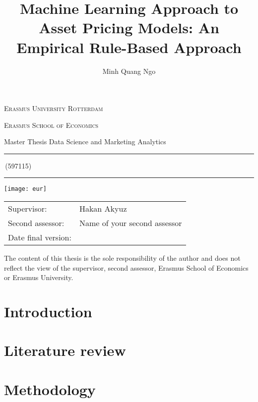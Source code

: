 \documentclass[a4paper,11pt]{article}
\author{Minh Quang Ngo}
\title{Machine Learning Approach to Asset Pricing Models: An Empirical Rule-Based Approach}
\newcommand{\studentnumber}{597115}
\newcommand{\program}{Data Science and Marketing Analytics}
\newcommand{\supervisor}{Hakan Akyuz}
\newcommand{\secondassesor}{Name of your second assessor}
\begin{document}
\begin{titlepage}
\makeatletter
\begin{center}
	\textsc{Erasmus University Rotterdam}
	\par \textsc{Erasmus School of Economics}
	\par Master Thesis \program

	\vfill \hrule height .08em \bigskip
	\par\huge\@title\bigskip
	\par\Large\@author\,(\studentnumber)\bigskip
	\hrule height .08em\normalsize
	
	\vfill
	\texttt{[image: eur]} %
	\vfill
	
	\begin{tabular}{ll}
		\toprule
		Supervisor: & \supervisor\\
		Second assessor: & \secondassesor\\
		Date final version: & \@date\\
		\bottomrule
	\end{tabular}
	
	\vfill
	The content of this thesis is the sole responsibility of the author and does not reflect the view of the supervisor, second assessor, Erasmus School of Economics or Erasmus University.
\end{center}
\makeatother
\end{titlepage}

\begin{abstract}
	
\end{abstract}
\newpage

\tableofcontents
\newpage

\section{Introduction} \label{sec:introduction}
    
\section{Literature review} \label{sec:litrev}
	
\section{Methodology} \label{sec:method}
    
\end{document}
